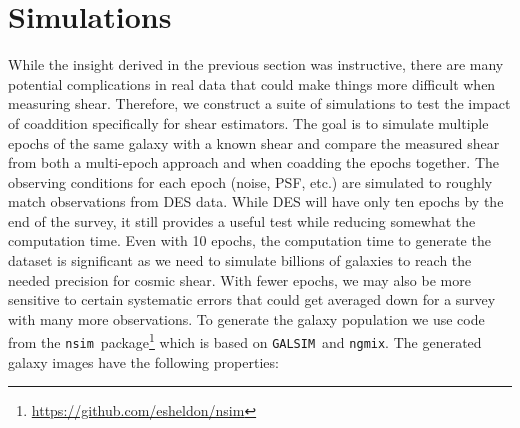 \documentclass[fleqn,useAMS,usenatbib]{mnras}
\newcommand{\galsim}{\texttt{GALSIM}}
\newcommand{\ngmix}{\texttt{ngmix}}
\newcommand{\nnsim}{\texttt{nsim}}
\begin{document}
\section{Simulations}
\label{Section:Simulation}
While the insight derived in the previous section was instructive, there are 
many potential complications in real data that could make things more difficult when 
measuring shear.  Therefore, we construct a suite of simulations to test the 
impact of coaddition specifically for shear estimators.  The goal is to 
simulate multiple epochs of the same galaxy with a known shear and compare the 
measured shear from both a multi-epoch approach and when coadding the epochs 
together.  The observing conditions for each epoch (noise, PSF, etc.) are 
simulated to roughly match observations from DES data.  While DES will have 
only ten epochs by the end of the survey, it still provides a useful test while 
reducing somewhat the computation time.  Even with 10 epochs, the computation 
time to generate the dataset is significant as we need to simulate billions of 
galaxies to reach the needed precision for cosmic shear.  With fewer epochs, we 
may also be more sensitive to certain systematic errors that could get averaged 
down for a survey with many more observations.
To generate the galaxy population we use code from the \nnsim\ package\footnote{\url{https://github.com/esheldon/nsim}} which is based on \galsim\ 
and \ngmix.  The generated galaxy images have the following properties:
\end{document}
